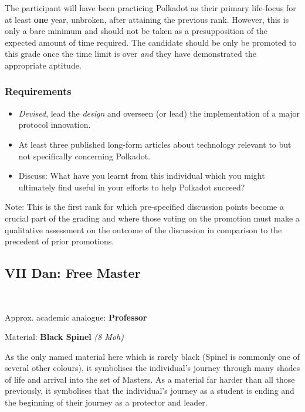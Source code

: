\documentclass[9pt,oneside]{amsart}
\begin{document}
The participant will have been practicing Polkadot as their primary life-focus for at least \textbf{one} year, unbroken, after attaining the previous rank. However, this is only a bare minimum and should not be taken as a presupposition of the expected amount of time required. The candidate should be only be promoted to this grade once the time limit is over \emph{and} they have demonstrated the appropriate aptitude.

\subsubsection{Requirements}\label{requirements-5}

\begin{itemize}
\item \emph{Devised}, lead the \emph{design} and overseen (or lead) the implementation of a major protocol innovation.
\item At least three published long-form articles about technology relevant to but not specifically concerning Polkadot.
\item Discuss: What have you learnt from this individual which you might ultimately find useful in your efforts to help Polkadot succeed?
\end{itemize}

Note: This is the first rank for which pre-specified discussion points become a crucial part of the grading and where those voting on the promotion must make a qualitative assessment on the outcome of the discussion in comparison to the precedent of prior promotions.

\subsection{VII Dan: Free Master}\label{vii-dan-free-master}~\\


Approx. academic analogue: \textbf{Professor}

Material: \textbf{Black Spinel} \emph{(8 Moh)}

As the only named material here which is rarely black (Spinel is commonly one of several other colours), it symbolises the individual's journey through many shades of life and arrival into the set of Masters. As a material far harder than all those previously, it symbolises that the individual's journey as a student is ending and the beginning of their journey as a protector and leader.
\end{document}
